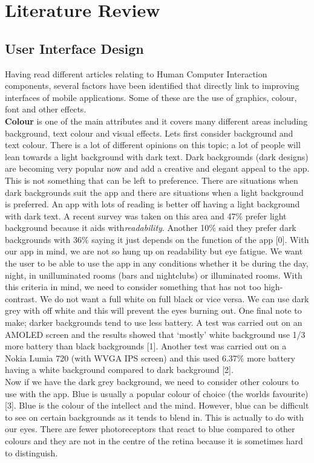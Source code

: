 \section{Literature Review}

\subsection{User Interface Design}
Having read different articles relating to Human Computer Interaction components, several factors have been identified that directly link to improving interfaces of mobile applications.  Some of these are the use of graphics, colour, font and other effects.  \\
\textbf{Colour} is one of the main attributes and it covers many different areas including background, text colour and visual effects.  Lets first consider background and text colour.  There is a lot of different opinions on this topic; a lot of people will lean towards a light background with dark text.  Dark backgrounds (dark designs) are becoming very popular now and add a creative and elegant appeal to the app.  This is not something that can be left to preference.  There are situations when dark backgrounds suit the app and there are situations when a light background is preferred.  An app with lots of reading is better off having a light background with dark text.  A recent survey was taken on this area and 47\% prefer light background because it aids with\emph{readability}.   Another 10\% said they prefer dark backgrounds with 36\% saying it just depends on the function of the app [0].  With our app in mind, we are not so hung up on readability but eye fatigue.  We want the user to be able to use the app in any conditions whether it be during the day, night, in unilluminated rooms (bars and nightclubs) or illuminated rooms.  With this criteria in mind, we need to consider something that has not too high-contrast.  We do not want a full white on full black or vice versa.  We can use dark grey with off white and this will prevent the eyes burning out.  One final note to make; darker backgrounds tend to use less battery.  A test was carried out on an AMOLED screen and the results showed that `mostly' white background use 1/3 more battery than black backgrounds [1].  Another test was carried out on a Nokia Lumia 720 (with WVGA IPS screen) and this used 6.37\% more battery having a white background compared to dark background [2].  \\
Now if we have the dark grey background, we need to consider other colours to use with the app.  Blue is usually a popular colour of choice (the worlds favourite) [3].  Blue is the colour of the intellect and the mind.  However, blue can be difficult to see on certain backgrounds as it tends to blend in.  This is actually to do with our eyes.  There are fewer photoreceptors that react to blue compared to other colours and they are not in the centre of the retina because it is sometimes hard to distinguish.  \\
